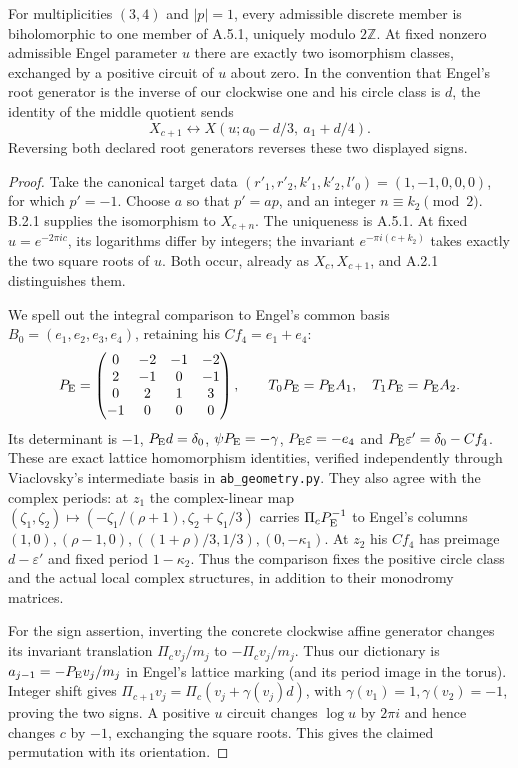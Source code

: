 \begin{proposition}\label{fam:src:B.2.2}\label{fam:st:B.2.2}
For multiplicities $(3,4)$ and $|p|=1$, every admissible discrete member is biholomorphic to one member of A.5.1, uniquely modulo $2\mathbb Z$. At fixed nonzero admissible Engel parameter $u$ there are exactly two isomorphism classes, exchanged by a positive circuit of $u$ about zero. In the convention that Engel's root generator is the inverse of our clockwise one and his circle class is $d$, the identity of the middle quotient sends
\[
 X_{c+1}\longleftrightarrow X(u;a_0-d/3,\ a_1+d/4).
\]
Reversing both declared root generators reverses these two displayed signs.
\end{proposition}
\begin{proof}
Take the canonical target data $(r'_1,r'_2,k'_1,k'_2,l'_0)=(1,-1,0,0,0)$, for which $p'=-1$. Choose $a$ so that $p'=ap$, and an integer $n\equiv k_2\pmod2$. B.2.1 supplies the isomorphism to $X_{c+n}$. The uniqueness is A.5.1. At fixed $u=e^{-2\pi ic}$, its logarithms differ by integers; the invariant $e^{-\pi i(c+k_2)}$ takes exactly the two square roots of $u$. Both occur, already as $X_c,X_{c+1}$, and A.2.1 distinguishes them.

We spell out the integral comparison to Engel's common basis $B_0=(e_1,e_2,e_3,e_4)$, retaining his $C f_4=e_1+e_4$:
\[
 P_{\rm E}=\begin{pmatrix}0&-2&-1&-2\\2&-1&0&-1\\0&2&1&3\\-1&0&0&0\end{pmatrix},\qquad
 T_0P_{\rm E}=P_{\rm E}A_1,\quad T_1P_{\rm E}=P_{\rm E}A_2.
\]
Its determinant is $-1$, $P_{\rm E}d=\delta_0$, $\psi P_{\rm E}=-\gamma$, $P_{\rm E}\varepsilon=-e_4$ and $P_{\rm E}\varepsilon'=\delta_0-Cf_4$. These are exact lattice homomorphism identities, verified independently through Viaclovsky's intermediate basis in \texttt{ab\_geometry.py}. They also agree with the complex periods: at $z_1$ the complex-linear map
$(\zeta_1,\zeta_2)\mapsto(-\zeta_1/(\rho+1),\zeta_2+\zeta_1/3)$ carries $\Pi_cP_{\rm E}^{-1}$ to Engel's columns $(1,0),(\rho-1,0),((1+\rho)/3,1/3),(0,-\kappa_1)$. At $z_2$ his $Cf_4$ has preimage $d-\varepsilon'$ and fixed period $1-\kappa_2$. Thus the comparison fixes the positive circle class and the actual local complex structures, in addition to their monodromy matrices.

For the sign assertion, inverting the concrete clockwise affine generator changes its invariant translation $\Pi_cv_j/m_j$ to $-\Pi_cv_j/m_j$. Thus our dictionary is $a_{j-1}=-P_{\rm E}v_j/m_j$ in Engel's lattice marking (and its period image in the torus). Integer shift gives $\Pi_{c+1}v_j=\Pi_c(v_j+\gamma(v_j)d)$, with $\gamma(v_1)=1,\gamma(v_2)=-1$, proving the two signs. A positive $u$ circuit changes $\log u$ by $2\pi i$ and hence changes $c$ by $-1$, exchanging the square roots. This gives the claimed permutation with its orientation.
\end{proof}

